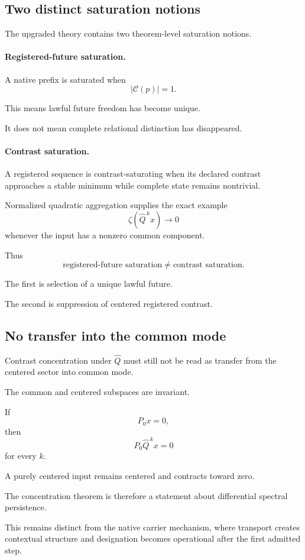 \subsection{Two distinct saturation notions}

The upgraded theory contains two theorem-level saturation notions.

\paragraph{Registered-future saturation.}
A native prefix is saturated when
\[
|\mathcal C(p)|=1.
\]

This means lawful future freedom has become unique.

It does not mean complete relational distinction has disappeared.

\paragraph{Contrast saturation.}
A registered sequence is contrast-saturating when its declared
contrast approaches a stable minimum while complete state remains
nontrivial.

Normalized quadratic aggregation supplies the exact example
\[
\zeta(\widehat Q^{\,k}x)\longrightarrow0
\]
whenever the input has a nonzero common component.

Thus
\[
\text{registered-future saturation}
\neq
\text{contrast saturation}.
\]

The first is selection of a unique lawful future.

The second is suppression of centered registered contrast.

\subsection{No transfer into the common mode}

Contrast concentration under \(\widehat Q\) must still not be read as
transfer from the centered sector into common mode.

The common and centered subspaces are invariant.

If
\[
P_0x=0,
\]
then
\[
P_0\widehat Q^{\,k}x=0
\]
for every \(k\).

A purely centered input remains centered and contracts toward zero.

The concentration theorem is therefore a statement about differential
spectral persistence.

This remains distinct from the native carrier mechanism, where
transport creates contextual structure and designation becomes
operational after the first admitted step.

